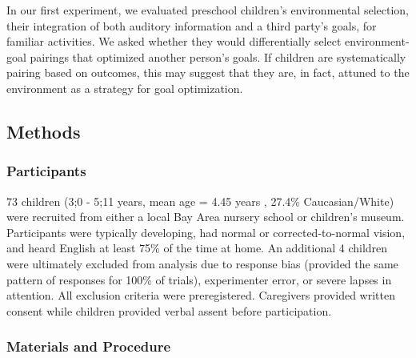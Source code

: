 \documentclass[10pt, letterpaper]{article}
\begin{document}
In our first experiment, we evaluated preschool children's environmental
selection, their integration of both auditory information and a third
party's goals, for familiar activities. We asked whether they would
differentially select environment-goal pairings that optimized another
person's goals. If children are systematically pairing based on
outcomes, this may suggest that they are, in fact, attuned to the
environment as a strategy for goal optimization.

\hypertarget{methods}{%
\subsection{Methods}\label{methods}}

\hypertarget{participants}{%
\subsubsection{Participants}\label{participants}}

73 children (3;0 - 5;11 years, mean age = 4.45 years , 27.4\%
Caucasian/White) were recruited from either a local Bay Area nursery
school or children's museum. Participants were typically developing, had
normal or corrected-to-normal vision, and heard English at least 75\% of
the time at home. An additional 4 children were ultimately excluded from
analysis due to response bias (provided the same pattern of responses
for 100\% of trials), experimenter error, or severe lapses in attention.
All exclusion criteria were preregistered. Caregivers provided written
consent while children provided verbal assent before participation.

\hypertarget{materials-and-procedure}{%
\subsubsection{Materials and Procedure}\label{materials-and-procedure}}
\end{document}
